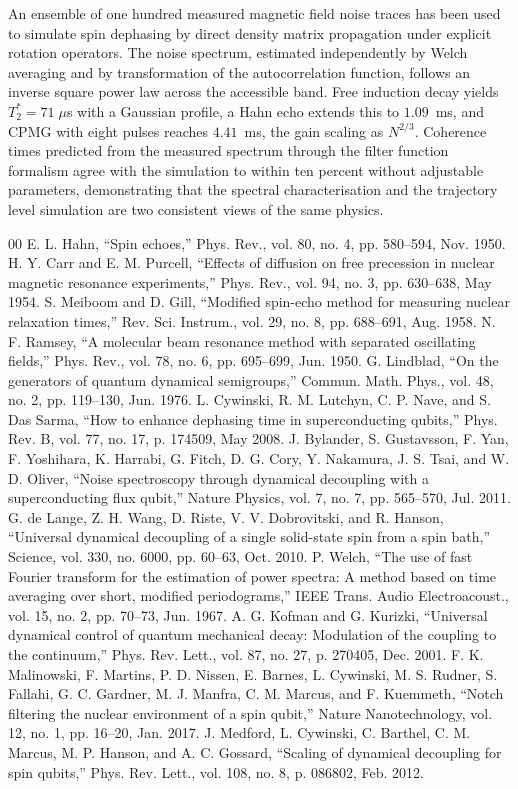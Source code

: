 \documentclass[conference]{IEEEtran}
\begin{document}
An ensemble of one hundred measured magnetic field noise traces has been used to
simulate spin dephasing by direct density matrix propagation under explicit
rotation operators. The noise spectrum, estimated independently by Welch averaging
and by transformation of the autocorrelation function, follows an inverse square
power law across the accessible band. Free induction decay yields
$T_2^{*} = 71\;\mu$s with a Gaussian profile, a Hahn echo extends this to
$1.09$~ms, and CPMG with eight pulses reaches $4.41$~ms, the gain scaling as
$N^{2/3}$. Coherence times predicted from the measured spectrum through the filter
function formalism agree with the simulation to within ten percent without
adjustable parameters, demonstrating that the spectral characterisation and the
trajectory level simulation are two consistent views of the same physics.

\begin{thebibliography}{00}
 E. L. Hahn, ``Spin echoes,'' Phys. Rev., vol. 80, no. 4,
pp. 580--594, Nov. 1950.
 H. Y. Carr and E. M. Purcell, ``Effects of diffusion on free
precession in nuclear magnetic resonance experiments,'' Phys. Rev., vol. 94,
no. 3, pp. 630--638, May 1954.
 S. Meiboom and D. Gill, ``Modified spin-echo method for measuring
nuclear relaxation times,'' Rev. Sci. Instrum., vol. 29, no. 8, pp. 688--691,
Aug. 1958.
 N. F. Ramsey, ``A molecular beam resonance method with separated
oscillating fields,'' Phys. Rev., vol. 78, no. 6, pp. 695--699, Jun. 1950.
 G. Lindblad, ``On the generators of quantum dynamical semigroups,''
Commun. Math. Phys., vol. 48, no. 2, pp. 119--130, Jun. 1976.
 L. Cywinski, R. M. Lutchyn, C. P. Nave, and S. Das Sarma, ``How to
enhance dephasing time in superconducting qubits,'' Phys. Rev. B, vol. 77,
no. 17, p. 174509, May 2008.
 J. Bylander, S. Gustavsson, F. Yan, F. Yoshihara, K. Harrabi,
G. Fitch, D. G. Cory, Y. Nakamura, J. S. Tsai, and W. D. Oliver, ``Noise
spectroscopy through dynamical decoupling with a superconducting flux qubit,''
Nature Physics, vol. 7, no. 7, pp. 565--570, Jul. 2011.
 G. de Lange, Z. H. Wang, D. Riste, V. V. Dobrovitski, and
R. Hanson, ``Universal dynamical decoupling of a single solid-state spin from a
spin bath,'' Science, vol. 330, no. 6000, pp. 60--63, Oct. 2010.
 P. Welch, ``The use of fast Fourier transform for the estimation of
power spectra: A method based on time averaging over short, modified
periodograms,'' IEEE Trans. Audio Electroacoust., vol. 15, no. 2, pp. 70--73,
Jun. 1967.
 A. G. Kofman and G. Kurizki, ``Universal dynamical control of
quantum mechanical decay: Modulation of the coupling to the continuum,'' Phys.
Rev. Lett., vol. 87, no. 27, p. 270405, Dec. 2001.
 F. K. Malinowski, F. Martins, P. D. Nissen, E. Barnes,
L. Cywinski, M. S. Rudner, S. Fallahi, G. C. Gardner, M. J. Manfra,
C. M. Marcus, and F. Kuemmeth, ``Notch filtering the nuclear environment of a
spin qubit,'' Nature Nanotechnology, vol. 12, no. 1, pp. 16--20, Jan. 2017.
 J. Medford, L. Cywinski, C. Barthel, C. M. Marcus, M. P. Hanson,
and A. C. Gossard, ``Scaling of dynamical decoupling for spin qubits,'' Phys.
Rev. Lett., vol. 108, no. 8, p. 086802, Feb. 2012.
\end{thebibliography}
\end{document}
